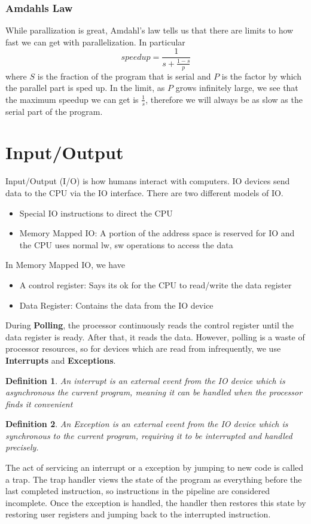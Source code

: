 \documentclass{article}
\newtheorem{definition}{Definition}
\begin{document}
\subsubsection{Amdahls Law}
While parallization is great, Amdahl's law tells us that there are limits to how fast we can get with parallelization.
In particular
$$speedup = \frac{1}{s+\frac{1-s}{p}}$$
where $S$ is the fraction of the program that is serial and $P$ is the factor by which the parallel part is sped up.
In the limit, as $P$ grows infinitely large, we see that the maximum speedup we can get is $\frac{1}{s}$, therefore we
will always be as slow as the serial part of the program.
\section{Input/Output}
Input/Output (I/O) is how humans interact with computers. IO devices send data to the CPU via the IO interface. There are two different models of IO.
\begin{itemize}
    \item Special IO instructions to direct the CPU
    \item Memory Mapped IO: A portion of the address space is reserved for IO and the CPU uses normal lw, sw operations to access the data
\end{itemize}
In Memory Mapped IO, we have
\begin{itemize}
    \item A control register: Says its ok for the CPU to read/write the data register
    \item Data Register: Contains the data from the IO device
\end{itemize}
During \textbf{Polling}, the processor continuously reads the control register until the data register is ready. After that, it reads the data.
However, polling is a waste of processor resources, so for devices which are read from infrequently, we use \textbf{Interrupts} and \textbf{Exceptions}.
\begin{definition}
    An interrupt is an external event from the IO device which is asynchronous the current program, meaning it can be handled when the processor finds it convenient
\end{definition}
\begin{definition}
    An Exception is an external event from the IO device which is synchronous to the current program, requiring it to be interrupted and handled precisely.
\end{definition}
The act of servicing an interrupt or a exception by jumping to new code is called a trap. The trap handler views the state of the program as everything before the last completed instruction,
so instructions in the pipeline are considered incomplete. Once the exception is handled, the handler then restores this state by restoring user registers and jumping back to the interrupted instruction.
\end{document}
